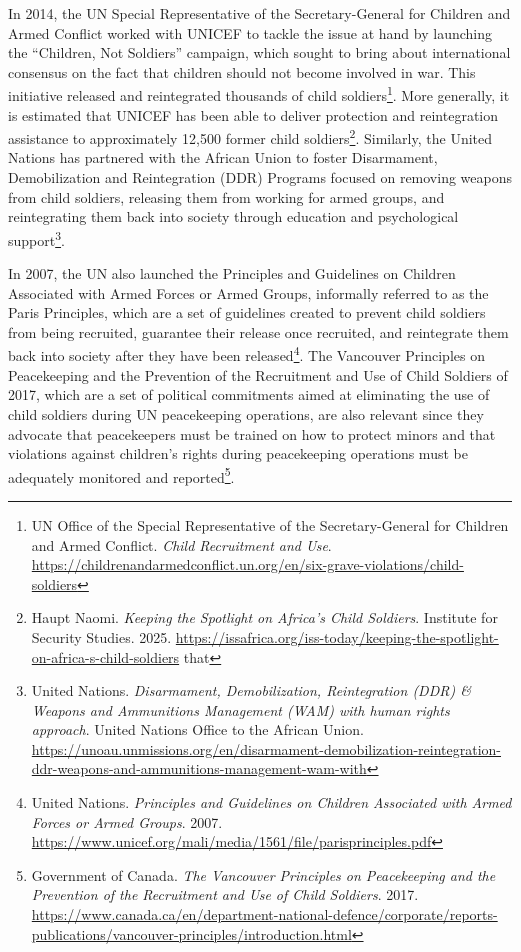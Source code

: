 In 2014, the UN Special Representative of the Secretary-General for Children and Armed Conflict worked with UNICEF to tackle the issue at hand by launching the “Children, Not Soldiers” campaign, which sought to bring about international consensus on the fact that children should not become involved in war. This initiative released and reintegrated thousands of child soldiers\footnote{UN Office of the Special Representative of the Secretary-General for Children and Armed Conflict. \emph{Child Recruitment and Use}. \url{https://childrenandarmedconflict.un.org/en/six-grave-violations/child-soldiers}}. More generally, it is estimated that UNICEF has been able to deliver protection and reintegration assistance to approximately 12,500 former child soldiers\footnote{Haupt Naomi. \emph{Keeping the Spotlight on Africa’s Child Soldiers}. Institute for Security Studies. 2025. \url{https://issafrica.org/iss-today/keeping-the-spotlight-on-africa-s-child-soldiers} that}. Similarly, the United Nations has partnered with the African Union to foster Disarmament, Demobilization and Reintegration (DDR) Programs focused on removing weapons from child soldiers, releasing them from working for armed groups, and reintegrating them back into society through education and psychological support\footnote{United Nations. \emph{Disarmament, Demobilization, Reintegration (DDR) \& Weapons and Ammunitions Management (WAM) with human rights approach}. United Nations Office to the African Union. \url{https://unoau.unmissions.org/en/disarmament-demobilization-reintegration-ddr-weapons-and-ammunitions-management-wam-with}}.

In 2007, the UN also launched the Principles and Guidelines on Children Associated with Armed Forces or Armed Groups, informally referred to as the Paris Principles, which are a set of guidelines created to prevent child soldiers from being recruited, guarantee their release once recruited, and reintegrate them back into society after they have been released\footnote{United Nations. \emph{Principles and Guidelines on Children Associated with Armed Forces or Armed Groups}. 2007. \url{https://www.unicef.org/mali/media/1561/file/parisprinciples.pdf}}. The Vancouver Principles on Peacekeeping and the Prevention of the Recruitment and Use of Child Soldiers of 2017, which are a set of political commitments aimed at eliminating the use of child soldiers during UN peacekeeping operations, are also relevant since they advocate that peacekeepers must be trained on how to protect minors and that violations against children’s rights during peacekeeping operations must be adequately monitored and reported\footnote{Government of Canada. \emph{The Vancouver Principles on Peacekeeping and the Prevention of the Recruitment and Use of Child Soldiers}. 2017. \url{https://www.canada.ca/en/department-national-defence/corporate/reports-publications/vancouver-principles/introduction.html}}.

